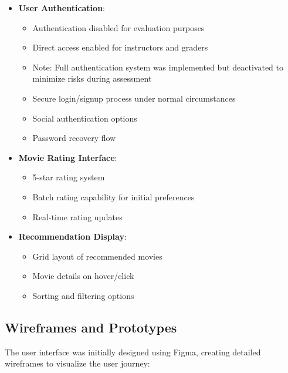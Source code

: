 \documentclass[12pt]{article}
\begin{document}
\begin{itemize}
    \item \textbf{User Authentication}:
    \begin{itemize}
        \item Authentication disabled for evaluation purposes
        \item Direct access enabled for instructors and graders
        \item Note: Full authentication system was implemented but deactivated to minimize risks during assessment
        \item Secure login/signup process under normal circumstances
        \item Social authentication options
        \item Password recovery flow
    \end{itemize}
    
    \item \textbf{Movie Rating Interface}:
    \begin{itemize}
        \item 5-star rating system
        \item Batch rating capability for initial preferences
        \item Real-time rating updates
    \end{itemize}
    
    \item \textbf{Recommendation Display}:
    \begin{itemize}
        \item Grid layout of recommended movies
        \item Movie details on hover/click
        \item Sorting and filtering options
    \end{itemize}
\end{itemize}

\subsection{Wireframes and Prototypes}
The user interface was initially designed using Figma, creating detailed wireframes to visualize the user journey:
\end{document}
